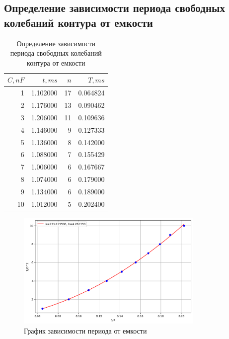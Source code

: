 \documentclass[a4paper, 12pt]{article}
\begin{document}
\subsection{Определение зависимости периода свободных колебаний контура от емкости}

\begin{table}[h]
    \centering
\begin{tabular}{rrrr}
    \toprule
    $C, nF$ & $t, ms$ & $n$ & $T, ms$ \\
    \midrule
    1 & 1.102000 & 17 & 0.064824 \\
    2 & 1.176000 & 13 & 0.090462 \\
    3 & 1.206000 & 11 & 0.109636 \\
    4 & 1.146000 & 9 & 0.127333 \\
    5 & 1.136000 & 8 & 0.142000 \\
    6 & 1.088000 & 7 & 0.155429 \\
    7 & 1.006000 & 6 & 0.167667 \\
    8 & 1.074000 & 6 & 0.179000 \\
    9 & 1.134000 & 6 & 0.189000 \\
    10 & 1.012000 & 5 & 0.202400 \\
    \bottomrule
    \end{tabular}
    \caption{Определение зависимости периода свободных колебаний контура от емкости}
\end{table}

\begin{figure}[h!]
    \centering
    \includegraphics[width=90mm]{./imgs/лист1.png}
    \caption{График зависимости периода от емкости}
\end{figure}


\newpage
\end{document}
